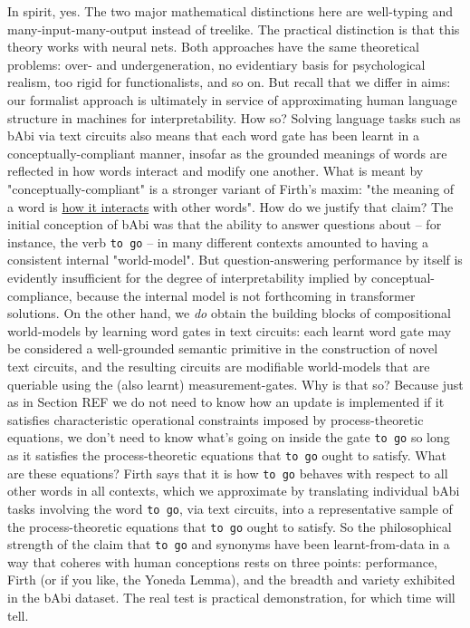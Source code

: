  In spirit, yes. The two major mathematical distinctions here are well-typing and many-input-many-output instead of treelike. The practical distinction is that this theory works with neural nets. Both approaches have the same theoretical problems: over- and undergeneration, no evidentiary basis for psychological realism, too rigid for functionalists, and so on. But recall that we differ in aims: our formalist approach is ultimately in service of approximating human language structure in machines for interpretability. How so? Solving language tasks such as bAbi via text circuits also means that each word gate has been learnt in a conceptually-compliant manner, insofar as the grounded meanings of words are reflected in how words interact and modify one another. What is meant by "conceptually-compliant" is a stronger variant of Firth's maxim: "the meaning of a word is \underline{how it interacts} with other words". How do we justify that claim? The initial conception of bAbi was that the ability to answer questions about -- for instance, the verb \texttt{to go} -- in many different contexts amounted to having a consistent internal "world-model". But question-answering performance by itself is evidently insufficient for the degree of interpretability implied by conceptual-compliance, because the internal model is not forthcoming in transformer solutions. On the other hand, we \emph{do} obtain the building blocks of compositional world-models by learning word gates in text circuits: each learnt word gate may be considered a well-grounded semantic primitive in the construction of novel text circuits, and the resulting circuits are modifiable world-models that are queriable using the (also learnt) measurement-gates. Why is that so? Because just as in Section \bR REF \e we do not need to know how an update is implemented if it satisfies characteristic operational constraints imposed by process-theoretic equations, we don't need to know what's going on inside the gate \texttt{to go} so long as it satisfies the process-theoretic equations that \texttt{to go} ought to satisfy. What are these equations? Firth says that it is how \texttt{to go} behaves with respect to all other words in all contexts, which we approximate by translating individual bAbi tasks involving the word \texttt{to go}, via text circuits, into a representative sample of the process-theoretic equations that \texttt{to go} ought to satisfy. So the philosophical strength of the claim that \texttt{to go} and synonyms have been learnt-from-data in a way that coheres with human conceptions rests on three points: performance, Firth (or if you like, the Yoneda Lemma), and the breadth and variety exhibited in the bAbi dataset. The real test is practical demonstration, for which time will tell.

